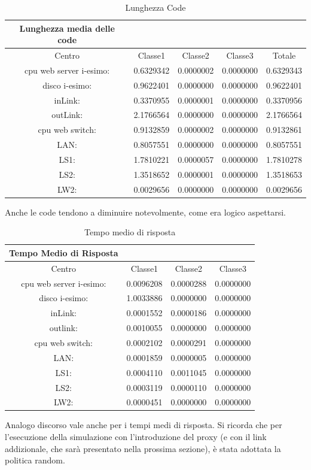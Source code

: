 \begin{table}[htbp]
\begin{center}
\begin{tabular}{|c|c|c|c|c|}
\hline
Lunghezza media delle code\\
\hline
Centro &Classe1 &Classe2 &Classe3 &Totale\\
\hline
\hline
 cpu web server i-esimo: 	&0.6329342	&0.0000002	&0.0000000	&0.6329343\\
\hline
 disco i-esimo: 	&0.9622401	&0.0000000	&0.0000000	&0.9622401\\
\hline
 inLink: 	&0.3370955	&0.0000001	&0.0000000	&0.3370956\\
\hline
 outLink: 	&2.1766564	&0.0000000	&0.0000000	&2.1766564\\
\hline
 cpu web switch: 	&0.9132859	&0.0000002	&0.0000000	&0.9132861\\
\hline
 LAN: 	&0.8057551	&0.0000000	&0.0000000	&0.8057551\\
\hline
 LS1: 	&1.7810221	&0.0000057	&0.0000000	&1.7810278\\
\hline
 LS2: 	&1.3518652	&0.0000001	&0.0000000	&1.3518653\\
\hline
 LW2: 	&0.0029656	&0.0000000	&0.0000000	&0.0029656\\
\hline
\end{tabular}
\end{center}
\caption{Lunghezza Code}
\label{lunghezzacode}
\end{table}
Anche le code tendono a diminuire notevolmente, come era logico aspettarsi. 
\begin{table}[htbp]
\begin{center}
\begin{tabular}{|c|c|c|c|}
\hline
Tempo Medio di Risposta\\
\hline
Centro &Classe1 &Classe2 &Classe3\\
\hline
\hline
 cpu web server i-esimo: 	&0.0096208	&0.0000288	&0.0000000\\
\hline
 disco i-esimo: 	&1.0033886	&0.0000000	&0.0000000\\
\hline
 inLink: 	&0.0001552	&0.0000186	&0.0000000\\
\hline
 outlink: 	&0.0010055	&0.0000000	&0.0000000\\
\hline
 cpu web switch: 	&0.0002102	&0.0000291	&0.0000000\\
\hline
 LAN: 	&0.0001859	&0.0000005	&0.0000000\\
\hline
 LS1: 	&0.0004110	&0.0011045	&0.0000000\\
\hline
 LS2: 	&0.0003119	&0.0000110	&0.0000000\\
\hline
 LW2: 	&0.0000451	&0.0000000	&0.0000000\\
\hline
\end{tabular}
\end{center}
\caption{Tempo medio di risposta}
\label{tempomediodirisposta}
\end{table}
Analogo discorso vale anche per i tempi medi di risposta. Si ricorda che per l'esecuzione della simulazione con l'introduzione del proxy (e con il link addizionale, che sarà presentato nella prossima  sezione), è stata adottata la politica random.

